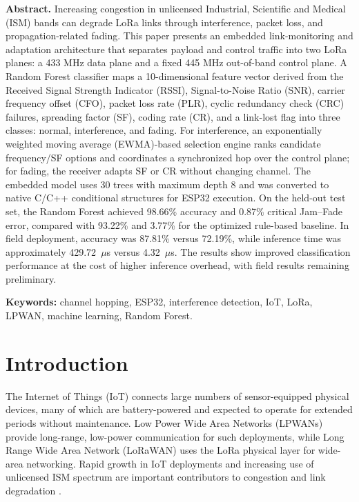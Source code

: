 \documentclass[10pt,a4paper]{article}
\begin{document}
\vspace{5pt}
{\fontsize{9}{11}\selectfont
\textbf{Abstract.} Increasing congestion in unlicensed Industrial, Scientific and Medical (ISM) bands can degrade LoRa links through interference, packet loss, and propagation-related fading. This paper presents an embedded link-monitoring and adaptation architecture that separates payload and control traffic into two LoRa planes: a 433 MHz data plane and a fixed 445 MHz out-of-band control plane. A Random Forest classifier maps a 10-dimensional feature vector derived from the Received Signal Strength Indicator (RSSI), Signal-to-Noise Ratio (SNR), carrier frequency offset (CFO), packet loss rate (PLR), cyclic redundancy check (CRC) failures, spreading factor (SF), coding rate (CR), and a link-lost flag into three classes: normal, interference, and fading. For interference, an exponentially weighted moving average (EWMA)-based selection engine ranks candidate frequency/SF options and coordinates a synchronized hop over the control plane; for fading, the receiver adapts SF or CR without changing channel. The embedded model uses 30 trees with maximum depth 8 and was converted to native C/C++ conditional structures for ESP32 execution. On the held-out test set, the Random Forest achieved 98.66\% accuracy and 0.87\% critical Jam--Fade error, compared with 93.22\% and 3.77\% for the optimized rule-based baseline. In field deployment, accuracy was 87.81\% versus 72.19\%, while inference time was approximately 429.72~$\mu$s versus 4.32~$\mu$s. The results show improved classification performance at the cost of higher inference overhead, with field results remaining preliminary.
\par}
\vspace{3pt}
{\fontsize{9}{11}\selectfont\textbf{Keywords:} channel hopping, ESP32, interference detection, IoT, LoRa, LPWAN, machine learning, Random Forest.\par}

\section{Introduction}
The Internet of Things (IoT) connects large numbers of sensor-equipped physical devices, many of which are battery-powered and expected to operate for extended periods without maintenance. Low Power Wide Area Networks (LPWANs) provide long-range, low-power communication for such deployments, while Long Range Wide Area Network (LoRaWAN) uses the LoRa physical layer for wide-area networking. Rapid growth in IoT deployments and increasing use of unlicensed ISM spectrum are important contributors to congestion and link degradation \cite{ericsson,augustin}.
\end{document}
